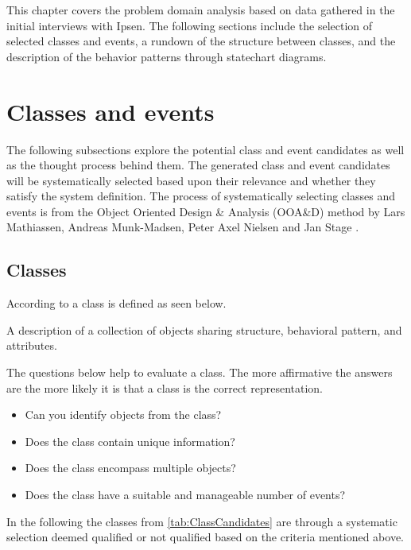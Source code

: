 This chapter covers the problem domain analysis based on data gathered in the initial interviews with Ipsen.
The following sections include the selection of selected classes and events, a rundown of the structure between classes, and the description of the behavior patterns through statechart diagrams.

\section{Classes and events}
The following subsections explore the potential class and event candidates as well as the thought process behind them.
The generated class and event candidates will be systematically selected based upon their relevance and whether they satisfy the system definition.
The process of systematically selecting classes and events is from the Object Oriented Design \& Analysis (OOA\&D) method by Lars Mathiassen, Andreas Munk-Madsen, Peter Axel Nielsen and Jan Stage \cite{Rod-Aalborg}.

\subsection{Classes} \label{sec:Classes}
According to  \citep[p.~55]{Rod-Aalborg} a class is defined as seen below.
\begin{defn}\label{defn:class}
	A description of a collection of objects sharing structure, behavioral pattern, and attributes.
\end{defn}

The questions below help to evaluate a class. The more affirmative the answers are the more likely it is that a class is the correct representation. \citep[p.~62]{Rod-Aalborg}
\begin{itemize}
	\item Can you identify objects from the class?
	\item Does the class contain unique information?
	\item Does the class encompass multiple objects?
	\item Does the class have a suitable and manageable number of events?
\end{itemize}

In the following the classes from \cref{tab:ClassCandidates} are through a systematic selection deemed qualified or not qualified based on the criteria mentioned above.

